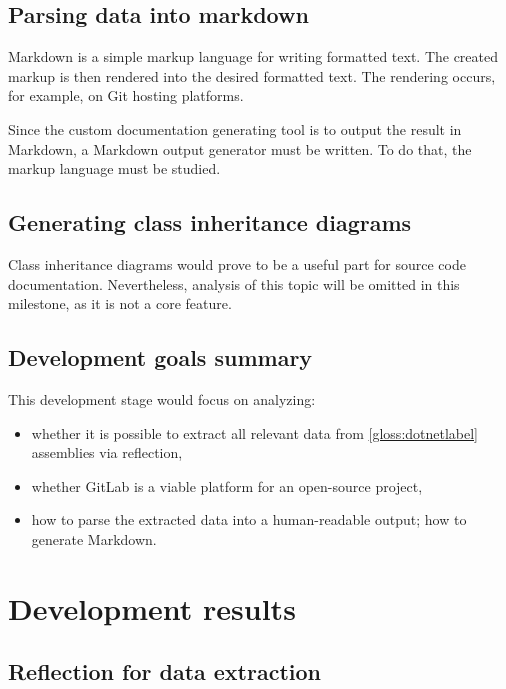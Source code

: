 \subsection{Parsing data into markdown}
Markdown is a simple markup language for writing formatted text. The created markup is then rendered into the desired formatted text. The rendering occurs, for example, on Git hosting platforms.

Since the custom documentation generating tool is to output the result in Markdown, a Markdown output generator must be written. To do that, the markup language must be studied.

\subsection{Generating class inheritance diagrams}
Class inheritance diagrams would prove to be a useful part for source code documentation. Nevertheless, analysis of this topic will be omitted in this milestone, as it is not a core feature.

\subsection{Development goals summary}
This development stage would focus on analyzing:
\begin{itemize}
    \item whether it is possible to extract all relevant data from \ref{gloss:dotnetlabel} assemblies via reflection,
    \item whether GitLab is a viable platform for an open-source project,
    \item how to parse the extracted data into a human-readable output; how to generate Markdown.
\end{itemize}

\section{Development results}

\subsection{Reflection for data extraction}

